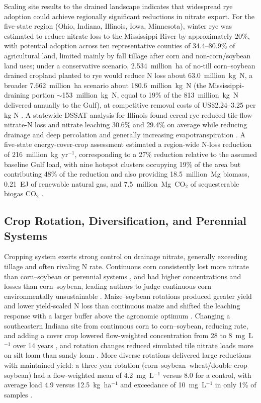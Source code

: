 \documentclass[11pt]{article}
\begin{document}
Scaling site results to the drained landscape indicates that widespread rye adoption could achieve regionally significant reductions in nitrate export. For the five-state region (Ohio, Indiana, Illinois, Iowa, Minnesota), winter rye was estimated to reduce nitrate loss to the Mississippi River by approximately 20\%, with potential adoption across ten representative counties of 34.4--80.9\% of agricultural land, limited mainly by fall tillage after corn and non-corn/soybean land uses; under a conservative scenario, 2.534~million~ha of no-till corn--soybean drained cropland planted to rye would reduce N loss about 63.0~million~kg~N, a broader 7.662~million~ha scenario about 180.6~million~kg~N (the Mississippi-draining portion $\sim$153~million~kg~N, equal to 19\% of the 813~million~kg~N delivered annually to the Gulf), at competitive removal costs of US\$2.24--3.25 per kg N \parencite{Kladivko2014}. A statewide DSSAT analysis for Illinois found cereal rye reduced tile-flow nitrate-N loss and nitrate leaching 30.6\% and 29.4\% on average while reducing drainage and deep percolation and generally increasing evapotranspiration \parencite{Gupta2023b}. A five-state energy-cover-crop assessment estimated a region-wide N-loss reduction of 216~million~kg~yr$^{-1}$, corresponding to a 27\% reduction relative to the assumed baseline Gulf load, with nine hotspot clusters occupying 19\% of the area but contributing 48\% of the reduction and also providing 18.5~million~Mg biomass, 0.21~EJ of renewable natural gas, and 7.5~million~Mg~CO$_2$ of sequesterable biogas CO$_2$ \parencite{Malone2023}.

\subsection{Crop Rotation, Diversification, and Perennial Systems}

Cropping system exerts strong control on drainage nitrate, generally exceeding tillage and often rivaling N rate. Continuous corn consistently lost more nitrate than corn--soybean or perennial systems \parencite{Weed1996}, and had higher concentrations and losses than corn--soybean, leading authors to judge continuous corn environmentally unsustainable \parencite{Kanwar1997}. Maize--soybean rotations produced greater yield and lower yield-scaled N loss than continuous maize \parencite{Zhao2016} and shifted the leaching response with a larger buffer above the agronomic optimum \parencite{Pasley2021}. Changing a southeastern Indiana site from continuous corn to corn--soybean, reducing rate, and adding a cover crop lowered flow-weighted concentration from 28 to 8~mg~L$^{-1}$ over 14 years \parencite{Ritter2015}, and rotation changes reduced simulated tile nitrate loads more on silt loam than sandy loam \parencite{Ahmed2007b}. More diverse rotations delivered large reductions with maintained yield: a three-year rotation (corn--soybean--wheat/double-crop soybean) had a flow-weighted mean of 4.2~mg~L$^{-1}$ versus 8.0 for a control, with average load 4.9 versus 12.5~kg~ha$^{-1}$ and exceedance of 10~mg~L$^{-1}$ in only 1\% of samples \parencite{Gentry2025}.
\end{document}
